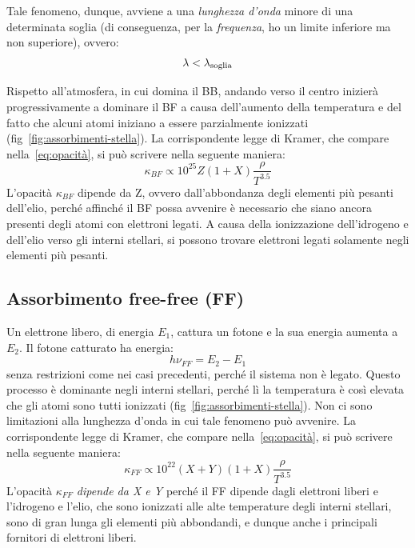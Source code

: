 Tale fenomeno, dunque, avviene a una \emph{lunghezza d'onda} minore di una determinata soglia (di conseguenza, per la \emph{frequenza}, ho un limite inferiore ma non superiore), ovvero:
\begin{equation}\label{eq:lunghezza-BF}
    \lambda < \lambda_\textup{soglia}
\end{equation}

Rispetto all'atmosfera, in cui domina il BB, andando verso il centro inizierà progressivamente a dominare il BF a causa dell'aumento della temperatura e del fatto che  alcuni atomi iniziano a essere parzialmente ionizzati (fig~\ref{fig:assorbimenti-stella}). La corrispondente legge di Kramer, che compare nella~\eqref{eq:opacità}, si può scrivere nella seguente maniera:
\begin{equation}
    \kappa_{BF} \propto 10^{25} Z (1+X) \dfrac{\rho}{T^{3.5}}
\end{equation}
L'opacità $\kappa_{BF}$ dipende da Z, ovvero dall'abbondanza degli elementi più pesanti dell'elio, perché affinché il BF possa avvenire è necessario che siano ancora presenti degli atomi con elettroni legati. A causa della ionizzazione dell'idrogeno e dell'elio verso gli interni stellari, si possono trovare elettroni legati solamente negli elementi più pesanti.

\subsection{Assorbimento free-free (FF)}\label{sec:free-free}
Un elettrone libero, di energia $E_1$, cattura un fotone e la sua energia aumenta a $E_2$. Il fotone catturato ha energia:
\begin{equation}
    h \nu_{FF} = E_2 - E_1
\end{equation}
senza restrizioni come nei casi precedenti, perché il sistema non è legato. Questo processo è dominante negli interni stellari, perché lì la temperatura è così elevata che gli atomi sono tutti ionizzati (fig~\ref{fig:assorbimenti-stella}). Non ci sono limitazioni alla lunghezza d'onda in cui tale fenomeno può avvenire. La corrispondente legge di Kramer, che compare nella~\eqref{eq:opacità}, si può scrivere nella seguente maniera:
\begin{equation}
   \kappa_{FF} \propto 10^{22} (X+Y) (1+X) \dfrac{\rho}{T^{3.5}}
\end{equation}
L'opacità $\kappa_{FF}$ \emph{dipende da X e Y} perché il FF dipende dagli elettroni liberi e l'idrogeno e l'elio, che sono ionizzati alle alte temperature degli interni stellari, sono di gran lunga gli elementi più abbondandi, e dunque anche i principali fornitori di elettroni liberi.

